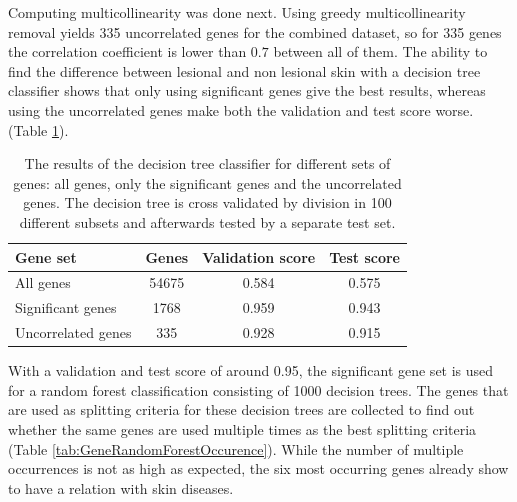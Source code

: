 \documentclass[10pt,a4paper]{report}
\begin{document}
	
	Computing multicollinearity was done next. Using greedy multicollinearity removal yields 335 uncorrelated genes for the combined dataset, so for 335 genes the correlation coefficient is lower than $0.7$ between all of them. The ability to find the difference between lesional and non lesional skin with a decision tree classifier shows that only using significant genes give the best results, whereas using the uncorrelated genes make both the validation and test score worse. (Table \ref{tab:DecisionTreeResults}).
	
	\begin{table}[H]
		\centering
		\caption{The results of the decision tree classifier for different sets of genes: all genes, only the significant genes and the uncorrelated genes. The decision tree is cross validated by division in 100 different subsets and afterwards tested by a separate test set.}
		\label{tab:DecisionTreeResults}
		\begin{tabular}{l|ccc}
			\textbf{Gene set}                                            & \textbf{Genes} & \textbf{Validation score} & \textbf{Test score} \\ \hline
			All genes                                                    & 54675             & 0.584                     & 0.575               \\
			Significant genes                                            & 1768              & 0.959                     & 0.943               \\
			Uncorrelated genes & 335               & 0.928                     & 0.915              
		\end{tabular}
	\end{table}
	
	With a validation and test score of around 0.95, the significant gene set is used for a random forest classification consisting of 1000 decision trees. The genes that are used as splitting criteria for these decision trees are collected to find out whether the same genes are used multiple times as the best splitting criteria (Table \ref{tab:GeneRandomForestOccurence}). While the number of multiple occurrences is not as high as expected, the six most occurring genes already show to have a relation with skin diseases. 
	
\end{document}
